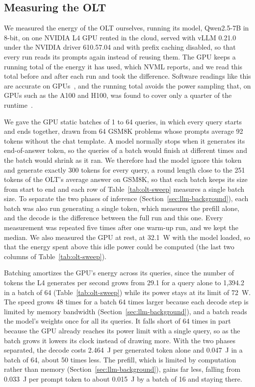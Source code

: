 \documentclass[cic,dipl,english]{infufrgs}
\begin{document}
\subsection{Measuring the OLT}
\label{sec:olt-energy}

We measured the energy of the OLT ourselves, running its model, Qwen2.5-7B in 8-bit, on
one NVIDIA L4 GPU rented in the cloud, served with vLLM 0.21.0~\cite{kwon2023vllm} under
the NVIDIA driver 610.57.04 and with prefix caching disabled, so that every run reads its
prompts again instead of reusing them. The GPU keeps a running total of the energy it has used, which NVML reports,
and we read this total before and after each run and took the difference. Software
readings like this are accurate on GPUs~\cite{chung2025mlenergy}, and the running total
avoids the power sampling that, on GPUs such as the A100 and H100, was found to cover only
a quarter of the runtime~\cite{yang2023part}.

We gave the GPU static batches of 1 to 64 queries, in which every query starts and ends
together, drawn from 64 GSM8K problems whose prompts average 92 tokens without the chat
template. A model normally stops when it generates its end-of-answer token, so the queries of
a batch would finish at different times and the batch would shrink as it ran. We therefore
had the model ignore this token and generate exactly 300 tokens for every query, a round
length close to the 251 tokens of the OLT's average answer on GSM8K, so that each batch keeps
its size from start to end and each row of Table~\ref{tab:olt-sweep} measures a single batch
size. To separate the two
phases of inference (Section~\ref{sec:llm-background}), each batch was also run
generating a single token, which measures the prefill alone, and the decode is the
difference between the full run and this one. Every measurement was repeated five times after one
warm-up run, and we kept the median. We also measured the GPU at rest, at 32.1~W with the
model loaded, so that the energy spent above this idle power could be computed (the last
two columns of Table~\ref{tab:olt-sweep}).

Batching amortizes the GPU's energy across its queries, since the number of tokens the L4
generates per second grows from 29.1 for a query alone to 1,394.2 in a batch of 64
(Table~\ref{tab:olt-sweep}) while its power stays at its limit of 72~W. The speed grows 48
times for a batch 64 times larger because each decode step is limited by memory
bandwidth (Section~\ref{sec:llm-background}), and a batch reads the model's weights once for
all its queries. It falls short of 64 times in part because the GPU already reaches its
power limit with a single query, so as the batch grows it lowers its clock instead of
drawing more. With the two phases separated, the decode costs 2.464~J per generated token
alone and 0.047~J in a batch of 64, about 50 times less. The
prefill, which is limited by computation rather than memory
(Section~\ref{sec:llm-background}), gains far less, falling from 0.033~J per prompt token
to about 0.015~J by a batch of 16 and staying there.
\end{document}
